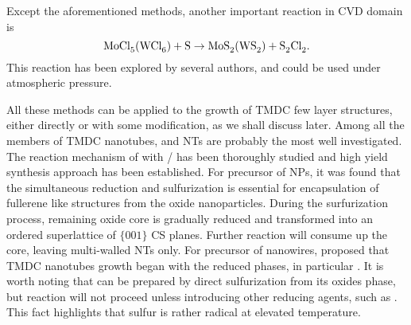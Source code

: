 Except the aforementioned methods, another important reaction in CVD domain is
\begin{equation}\label{eq:mclns}
\cee{MoCl5(WCl6) + S \rightarrow MoS2(WS2) + S2Cl2}.
\end{equation}
This reaction has been explored by several authors,\cite{Stoffels1999} and could be used under atmospheric pressure.\cite{Li2004a}

All these methods can be applied to the growth of TMDC few layer structures, either directly or with some modification, as we shall discuss later. Among all the members of TMDC nanotubes,  and  NTs are probably the most well investigated.\cite{Homyonfer1997,Tenne1998,Frey1998,Frey1999,Rothschild2000,Zak2000} The reaction mechanism of  with / has been thoroughly studied \cite{Feldman1998} and high yield synthesis approach has been established.\cite{Margolin2004} For precursor of  NPs, it was found that the simultaneous reduction and sulfurization is essential for encapsulation of fullerene like  structures from the oxide nanoparticles. During the surfurization process, remaining oxide core is gradually reduced and transformed into an ordered superlattice of $\{ 001 \}$ CS planes. Further reaction will consume up the  core, leaving multi-walled  NTs only. For precursor of  nanowires, \citeauthor{Feldman1996} proposed that TMDC nanotubes growth began with the reduced  phases, in particular .\cite{Feldman1996} It is worth noting that  can be prepared by direct sulfurization from its oxides phase, but reaction  will not proceed unless introducing other reducing agents, such as .\cite{Tsirlina1998} This fact highlights that sulfur is rather radical at elevated temperature.

